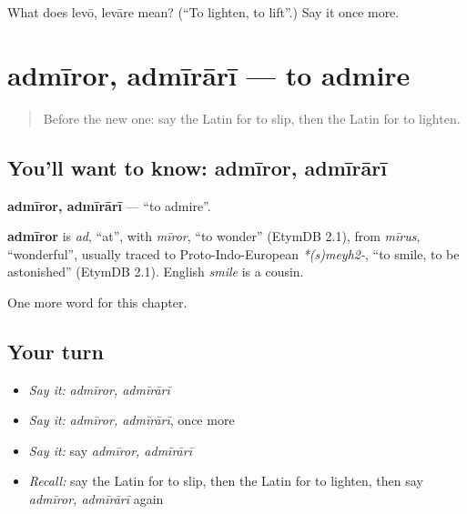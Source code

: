 \begin{tcolorbox}[breakable,colback=teal!4,colframe=teal!35!black,title={Before you move on}]
What does levō, levāre mean? (\textquotedblleft{}To lighten, to lift\textquotedblright{}.) Say it once more.
\end{tcolorbox}
\section[admīror, admīrārī]{admīror, admīrārī — to admire}

\label{lesson:LA-C170-admiror}



\begin{quote}
Before the new one: say the Latin for to slip, then the Latin for to lighten.
\end{quote}

\subsection*{You'll want to know: admīror, admīrārī}
\textbf{admīror, admīrārī} — \textquotedblleft{}to admire\textquotedblright{}.

\begin{cousinweb}
\textbf{admīror} is \emph{ad}, \textquotedblleft{}at\textquotedblright{}, with \emph{mīror}, \textquotedblleft{}to wonder\textquotedblright{} (EtymDB 2.1), from \emph{mīrus}, \textquotedblleft{}wonderful\textquotedblright{}, usually traced to Proto-Indo-European \emph{*(s)meyh2-}, \textquotedblleft{}to smile, to be astonished\textquotedblright{} (EtymDB 2.1). English \emph{smile} is a cousin.
\end{cousinweb}

\begin{grammarlens}[title={What you've built}]
One more word for this chapter.
\end{grammarlens}

\subsection*{Your turn}
\begin{itemize}
\raggedright
  \item \emph{Say it:} \emph{admīror, admīrārī}
  \item \emph{Say it:} \emph{admīror, admīrārī}, once more
  \item \emph{Say it:} say \emph{admīror, admīrārī}
  \item \emph{Recall:} say the Latin for to slip, then the Latin for to lighten, then say \emph{admīror, admīrārī} again
\end{itemize}

